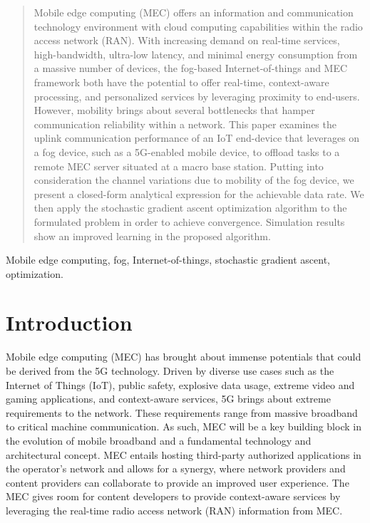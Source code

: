 \documentclass[conference,compsoc]{IEEEtran}
\theoremstyle{definition}
\begin{document}
\begin{abstract}

Mobile edge computing (MEC) offers an information and communication technology environment with cloud computing capabilities within the radio access network (RAN). With increasing demand on real-time services, high-bandwidth, ultra-low latency, and minimal energy consumption from a massive number of devices, the fog-based Internet-of-things and MEC framework both have the potential to offer real-time, context-aware processing, and personalized services by leveraging proximity to end-users. However, mobility brings about several bottlenecks that hamper communication reliability within a network. This paper examines the uplink communication performance of an IoT end-device that leverages on a fog device, such as a 5G-enabled mobile device, to offload tasks to a remote MEC server situated at a macro base station. Putting into consideration the channel variations due to mobility of the fog device, we present a closed-form analytical expression for the achievable data rate. We then apply the stochastic gradient ascent optimization algorithm to the formulated problem in order to achieve convergence. Simulation results show an improved learning in the proposed algorithm.

\end{abstract}

\begin{IEEEkeywords}
Mobile edge computing, fog, Internet-of-things, stochastic gradient ascent, optimization.
\end{IEEEkeywords}

\IEEEpeerreviewmaketitle


\section{Introduction}
Mobile edge computing (MEC) has brought about immense potentials that could be derived from the 5G technology. Driven by diverse use cases such as the Internet of Things (IoT), public safety, explosive data usage, extreme video and gaming applications, and context-aware services, 5G brings about extreme requirements to the network. These requirements range from massive broadband to critical machine communication. As such, MEC will be a key building block in the evolution of mobile broadband and a fundamental technology and architectural concept. MEC entails hosting third-party authorized applications in the operator's network and allows for a synergy, where network providers and content providers can collaborate to provide an improved user experience. The MEC gives room for content developers to provide context-aware services by leveraging the real-time radio access network (RAN) information from MEC.
\end{document}
